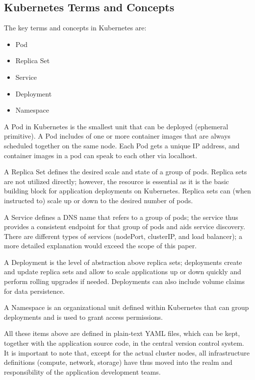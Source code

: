 \subsection{Kubernetes Terms and Concepts}

The key terms and concepts in Kubernetes are:
\begin{itemize}
\item Pod
\item Replica Set
\item Service
\item Deployment
\item Namespace
\end{itemize}

A Pod in Kubernetes is the smallest unit that can be deployed (ephemeral primitive). A Pod includes of one or more container images that are always scheduled together on the same node. Each Pod gets a unique IP address, and container images in a pod can speak to each other via localhost.

A Replica Set defines the desired scale and state of a group of pods. Replica sets are not utilized directly; however, the resource is essential as it is the basic building block for application deployments on Kubernetes. Replica sets can (when instructed to) scale up or down to the desired number of pods.

A Service defines a DNS name that refers to a group of pods; the service thus provides a consistent endpoint for that group of pods and aids service discovery. There are different types of services (nodePort, clusterIP, and load balancer); a more detailed explanation would exceed the scope of this paper.

A Deployment is the level of abstraction above replica sets; deployments create and update replica sets and allow to scale applications up or down quickly and perform rolling upgrades if needed. Deployments can also include volume claims for data persistence.

A Namespace is an organizational unit defined within Kubernetes that can group deployments and is used to grant access permissions.

All these items above are defined in plain-text YAML files, which can be kept, together with the application source code, in the central version control system. It is important to note that, except for the actual cluster nodes, all infrastructure definitions (compute, network, storage) have thus moved into the realm and responsibility of the application development teams.

